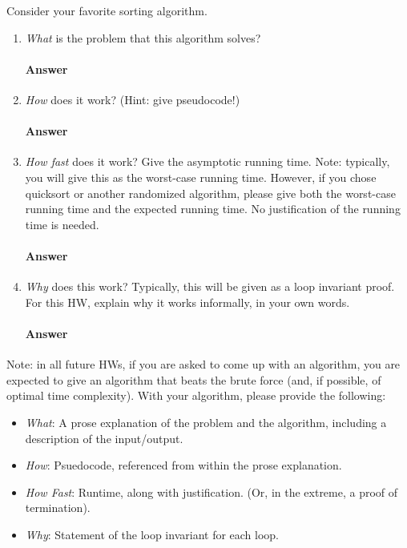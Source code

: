 \documentclass{article}
\begin{document}
\collab{\todo{}}
Consider your favorite sorting algorithm.
\begin{enumerate}
    \item \emph{What} is the problem that this algorithm solves?

        \paragraph{Answer}
        \todo{}

    \item \emph{How} does it work? (Hint: give pseudocode!)

        \paragraph{Answer}
        \todo{}

    \item \emph{How fast} does it work?  Give the asymptotic running time.
        Note: typically, you will give this as the worst-case running time.
        However, if you chose quicksort or another randomized algorithm, please
        give both the worst-case running time and the expected running time.  No
        justification of the running time is needed.

        \paragraph{Answer}
        \todo{}

    \item \emph{Why} does this work? Typically, this will be given as a loop
        invariant proof.  For this HW, explain why it works informally, in your
        own words.

        \paragraph{Answer}
        \todo{}

\end{enumerate}

Note: in all future HWs, if you are asked to come up with an algorithm, you are
expected to give an algorithm that beats the brute force (and, if possible, of
optimal time complexity). With your algorithm, please provide the following:
\begin{itemize}
    \item \emph{What}: A prose explanation of the problem and the algorithm,
        including a description of the input/output.
    \item \emph{How}: Psuedocode, referenced from within the prose explanation.
    \item \emph{How Fast}: Runtime, along with justification.  (Or, in the
        extreme, a proof of termination).
    \item \emph{Why}: Statement of the loop invariant for each loop.
\end{itemize}
\end{document}
